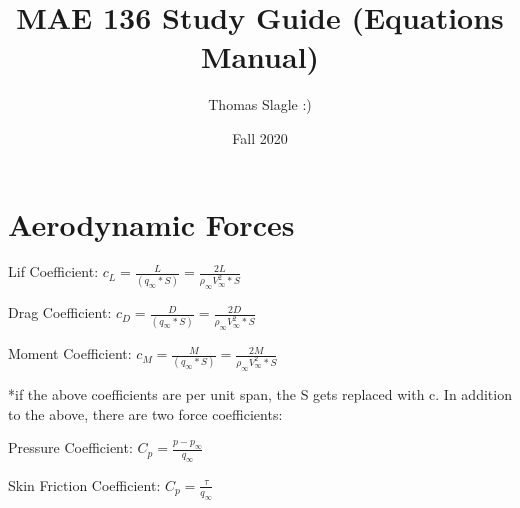\documentclass{article}
\title{MAE 136 Study Guide (Equations Manual)}
\author{Thomas Slagle :)}
\date{Fall 2020}
\begin{document}
    \maketitle

    \section{Aerodynamic Forces}
    \begin{flushleft}
        Lif Coefficient: $c_L = \frac{L}{(q_\infty*S)} = \frac{2L}{\rho_\infty V_\infty^2*S}$

        Drag Coefficient: $c_D = \frac{D}{(q_\infty*S)} = \frac{2D}{\rho_\infty V_\infty^2*S}$

        Moment Coefficient: $c_M = \frac{M}{(q_\infty*S)} = \frac{2M}{\rho_\infty V_\infty^2*S}$

        *if the above coefficients are per unit span, the S gets replaced with c. In addition to the above, there are two force coefficients:

        Pressure Coefficient: $C_p = \frac{p-p_\infty}{q_\infty}$

        Skin Friction Coefficient: $C_p = \frac{\tau}{q_\infty}$



    \end{flushleft}
\end{document}
